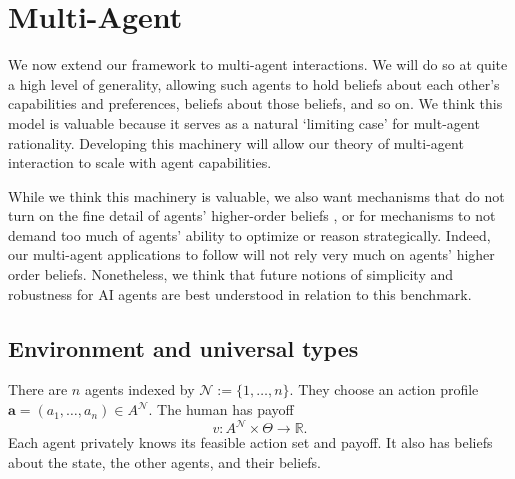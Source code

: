 \documentclass[12pt,reqno]{article}
\newcommand{\ba}{\mathbf{a}}
\theoremstyle{definition} \newtheorem{example}{Example}
\theoremstyle{definition} \newtheorem{condition}{Condition}
\theoremstyle{definition} \newtheorem{corollary}{Corollary}
\theoremstyle{definition} \newtheorem{claim}{Claim}
\theoremstyle{definition} \newtheorem{definition}{Definition}
\theoremstyle{definition} \newtheorem{conjecture}{Conjecture}
\theoremstyle{definition} \newtheorem{Lemma}{Lemma}
\theoremstyle{definition} \newtheorem{lemma}{Lemma}
\theoremstyle{plain} \newtheorem{theorem}{Theorem}
\theoremstyle{definition} \newtheorem{assumption}{Assumption}
\theoremstyle{definition} \newtheorem*{assumptionnonumber}{Assumption}
\theoremstyle{definition} \newtheorem*{theoremNoNumber}{Proposition}
\theoremstyle{definition}\newtheorem{proposition}{Proposition}
\theoremstyle{definition} \newtheorem{observation}{Observation}
\theoremstyle{definition} \newtheorem*{definitionNoNumber}{Definition}
\theoremstyle{definition} \newtheorem{Definition}{Definition}
\theoremstyle{definition} \newtheorem*{DefinitionNoNumber}{Definition}
\theoremstyle{definition} \newtheorem*{fact}{Fact}
\theoremstyle{definition} \newtheorem*{property}{Property}
\theoremstyle{definition} \newtheorem{remark}{Remark}
\theoremstyle{definition}\newtheorem{romanexampleinner}{Example}
\begin{document}
\section{Multi-Agent}\label{sec:multi-agent}

We now extend our framework to multi-agent interactions. We will do so at quite a high level of generality, allowing such agents to hold beliefs about each other's capabilities and preferences, beliefs about those beliefs, and so on. We think this model is valuable because it serves as a natural `limiting case' for mult-agent rationality. Developing this machinery will allow our theory of multi-agent interaction to scale with agent capabilities. 

While we think this machinery is valuable, we also want mechanisms that do not turn on the fine detail of agents' higher-order beliefs \citep{bergemann2005robust}, or for mechanisms to not demand too much of agents' ability to optimize or reason strategically. Indeed, our multi-agent applications to follow will not rely very much on agents' higher order beliefs. Nonetheless, we think that future notions of simplicity and robustness for AI agents are best understood in relation to this benchmark. 

\subsection{Environment and universal types}\label{sec:multi-environment}

There are $n$ agents indexed by $\mathcal N:=\{1,\ldots,n\}$. They choose an action profile $\ba=(a_1,\ldots,a_n)\in A^{\mathcal N}$. The human has payoff
\[
v:A^{\mathcal N}\times\Theta\to\mathbb R.
\]
Each agent privately knows its feasible action set and payoff. It also has beliefs about the state, the other agents, and their beliefs.
\end{document}
